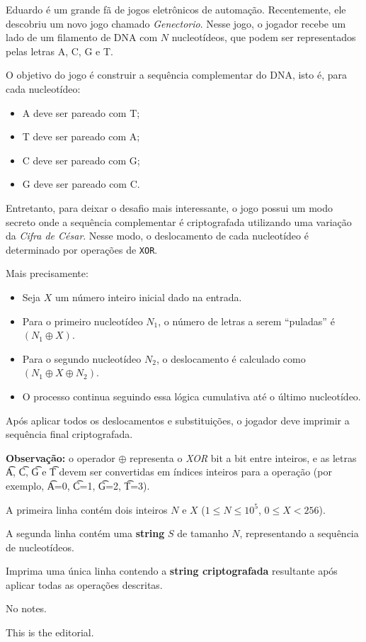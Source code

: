 Eduardo é um grande fã de jogos eletrônicos de automação. Recentemente, ele descobriu um novo jogo chamado \textit{Genectorio}. Nesse jogo, o jogador recebe um lado de um filamento de DNA com $N$ nucleotídeos, que podem ser representados pelas letras A, C, G e T.

O objetivo do jogo é construir a sequência complementar do DNA, isto é, para cada nucleotídeo:
\begin{itemize}
  \item A deve ser pareado com T;
  \item T deve ser pareado com A;
  \item C deve ser pareado com G;
  \item G deve ser pareado com C.
\end{itemize}

Entretanto, para deixar o desafio mais interessante, o jogo possui um modo secreto onde a sequência complementar é criptografada utilizando uma variação da \textit{Cifra de César}. Nesse modo, o deslocamento de cada nucleotídeo é determinado por operações de \texttt{XOR}.

Mais precisamente:
\begin{itemize}
  \item Seja $X$ um número inteiro inicial dado na entrada.
  \item Para o primeiro nucleotídeo $N_1$, o número de letras a serem “puladas” é $(N_1 \oplus X)$.
  \item Para o segundo nucleotídeo $N_2$, o deslocamento é calculado como $(N_1 \oplus X \oplus N_2)$.
  \item O processo continua seguindo essa lógica cumulativa até o último nucleotídeo.
\end{itemize}

Após aplicar todos os deslocamentos e substituições, o jogador deve imprimir a sequência final criptografada.

\textbf{Observação:} o operador $\oplus$ representa o \textit{XOR} bit a bit entre inteiros, e as letras \t{A}, \t{C}, \t{G} e \t{T} devem ser convertidas em índices inteiros para a operação (por exemplo, \t{A}=0, \t{C}=1, \t{G}=2, \t{T}=3).

A primeira linha contém dois inteiros $N$ e $X$ ($1 \le N \le 10^5$, $0 \le X < 256$).

A segunda linha contém uma \textbf{string} $S$ de tamanho $N$, representando a sequência de nucleotídeos.

Imprima uma única linha contendo a \textbf{string criptografada} resultante após aplicar todas as operações descritas.

No notes.

This is the editorial.
